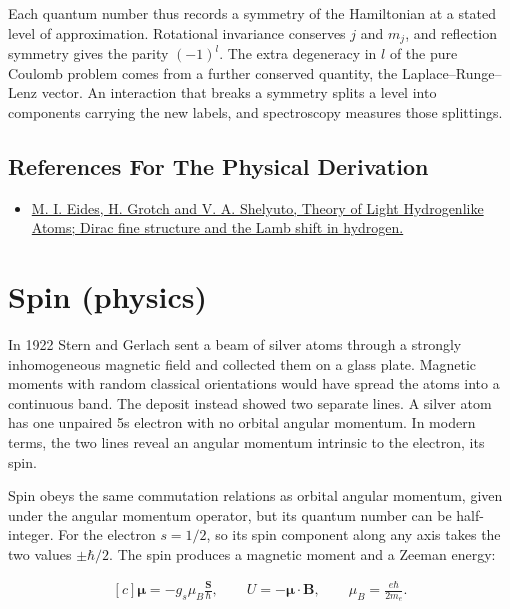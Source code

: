 \documentclass[11pt,oneside]{book}
\newenvironment{centeredalign}{\[\begin{gathered}[c]}{\end{gathered}\]}
\begin{document}
Each quantum number thus records a symmetry of the Hamiltonian at a stated level of approximation. Rotational invariance conserves \(j\) and \(m_j\), and reflection symmetry gives the parity \((-1)^l\). The extra degeneracy in \(l\) of the pure Coulomb problem comes from a further conserved quantity, the Laplace--Runge--Lenz vector. An interaction that breaks a symmetry splits a level into components carrying the new labels, and spectroscopy measures those splittings.

\subsection*{References For The Physical Derivation}
\begin{itemize}
\item \href{https://arxiv.org/abs/hep-ph/0002158}{M. I. Eides, H. Grotch and V. A. Shelyuto, Theory of Light Hydrogenlike Atoms; Dirac fine structure and the Lamb shift in hydrogen.}
\end{itemize}





\clearpage

\section{Spin (physics)}

\label{topic:spin-physics}

In 1922 Stern and Gerlach sent a beam of silver atoms through a strongly inhomogeneous magnetic field and collected them on a glass plate. Magnetic moments with random classical orientations would have spread the atoms into a continuous band. The deposit instead showed two separate lines. A silver atom has one unpaired 5s electron with no orbital angular momentum. In modern terms, the two lines reveal an angular momentum intrinsic to the electron, its spin.

Spin obeys the same commutation relations as orbital angular momentum, given under the angular momentum operator, but its quantum number can be half-integer. For the electron \(s=1/2\), so its spin component along any axis takes the two values \(\pm\hbar/2\). The spin produces a magnetic moment and a Zeeman energy:

\begin{centeredalign}
\boldsymbol\mu=-g_s\mu_B\frac{\mathbf S}{\hbar},\qquad U=-\boldsymbol\mu\cdot\mathbf B,
\qquad \mu_B=\frac{e\hbar}{2m_e}.
\end{centeredalign}
\end{document}
